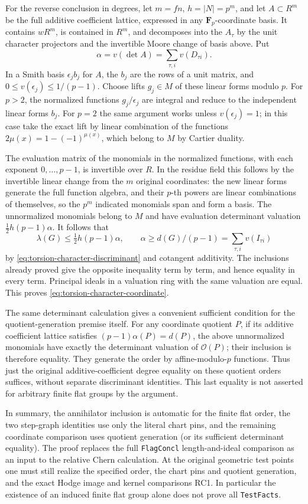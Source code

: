 For the reverse conclusion in degrees, let \(m=fn\),
\(h=|N|=p^m\), and let \(A\subset R^m\) be the full additive
coefficient lattice, expressed in any \(\mathbf F_p\)-coordinate
basis. It contains \(wR^m\), is contained in \(R^m\), and
decomposes into the \(A_\tau\) by the unit character projectors
and the invertible Moore change of basis above. Put
\[
 \alpha=v(\det A)=\sum_{\tau,i}v(D_{\tau i}).
\]
In a Smith basis \(\epsilon_j b_j\) for \(A\), the \(b_j\)
are the rows of a unit matrix, and
\(0\le v(\epsilon_j)\le 1/(p-1)\).
Choose lifts \(g_j\in M\) of these linear forms modulo \(p\).
For \(p>2\), the normalized functions \(g_j/\epsilon_j\)
are integral and reduce to the independent linear forms
\(b_j\). For \(p=2\) the same argument works unless
\(v(\epsilon_j)=1\); in this case take the exact lift by
linear combination of the functions \(2\mu(x)=1-(-1)^{\mu(x)}\),
which belong to \(M\) by Cartier duality.

The evaluation matrix of the monomials in the normalized
functions, with each exponent \(0,\ldots,p-1\), is invertible
over \(R\). In the residue field this follows by the invertible
linear change from the \(m\) original coordinates: the new
linear forms generate the full function algebra, and their
\(p\)-th powers are linear combinations of themselves, so the
\(p^m\) indicated monomials span and form a basis.
The unnormalized monomials belong to \(M\) and have
evaluation determinant valuation
\(\frac12 h(p-1)\alpha\).
It follows that
\[
 \lambda(G)\le\tfrac12 h(p-1)\alpha,\qquad
 \alpha\ge d(G)/(p-1)=\sum_{\tau,i}v(I_{\tau i})
\]
by \eqref{eq:torsion-character-discriminant} and cotangent
additivity. The inclusions already proved give the opposite
inequality term by term, and hence equality in every term.
Principal ideals in a valuation ring with the same valuation
are equal. This proves \eqref{eq:torsion-character-coordinate}.

The same determinant calculation gives a convenient sufficient
condition for the quotient-generation premise itself. For any
coordinate quotient \(P\), if its additive coefficient lattice
satisfies \((p-1)\alpha(P)=d(P)\), the above unnormalized
monomials have exactly the determinant valuation of
\(\mathcal O(P)\); their inclusion is therefore equality.
They generate the order by affine-modulo-\(p\) functions.
Thus just the original additive-coefficient degree equality
on these quotient orders suffices, without separate
discriminant identities. This last equality is not asserted
for arbitrary finite flat groups by the argument.

In summary, the annihilator inclusion is automatic for the
finite flat order, the two step-graph identities use only the
literal chart pins, and the remaining coordinate comparison
uses quotient generation (or its sufficient determinant
equality). The proof replaces the full \texttt{FlagConcl}
length-and-ideal comparison as an input to the relative
Chern calculation. At the original geometric test points one
must still realize the specified order, the chart pins and
quotient generation, and the exact Hodge image and kernel
comparisons RC1. In particular the existence of an induced
finite flat group alone does not prove all \texttt{TestFacts}.
